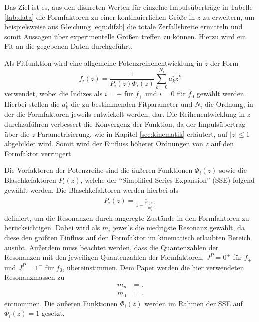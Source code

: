 Das Ziel ist es, aus den diskreten Werten für einzelne Impulsüberträge in Tabelle \ref{tab:data} die Formfaktoren zu einer kontinuierlichen Größe in $z$ zu erweitern, um beispielsweise aus Gleichung \eqref{eqn:difzb} die totale Zerfallsbreite ermitteln  und somit Aussagen über experimentelle Größen treffen zu können.
Hierzu wird ein Fit an die gegebenen Daten durchgeführt.

Als Fitfunktion wird eine allgemeine Potenzreihenentwicklung in $z$ der Form
\begin{equation}
  \label{eqn:reihenentwicklung}
  f_i(z) = \frac{1}{P_i(z) \Phi_i(z)} \sum_{k=0}^{N_i} a_{k}^{i} z^{k}
\end{equation}
verwendet, wobei die Indizes als $i=+$ für $f_+$ und $i=0$ für $f_0$ gewählt werden.
Hierbei stellen die $a_{k}^{i}$ die zu bestimmenden Fitparameter und $N_i$ die Ordnung, in der die Formfaktoren jeweils entwickelt werden, dar.
Die Reihenentwicklung in $z$ durchzuführen verbessert die Konvergenz der Funktion, da der Impulsübertrag über die $z$-Parametrisierung, wie in Kapitel \ref{sec:kinematik} erläutert, auf $\lvert z \rvert \leq 1$ abgebildet wird.
Somit wird der Einfluss höherer Ordnungen von $z$ auf den Formfaktor verringert.

Die Vorfaktoren der Potenzreihe sind die äußeren Funktionen $\Phi_i(z)$ sowie die Blaschkefaktoren $P_i(z)$, welche der \enquote{Simplified Series Expansion} (SSE) \cite{PhysRevD.79.013008} folgend gewählt werden.
Die Blaschkefaktoren werden hierbei als
\begin{align*}
  P_i(z) = \frac{1}{1 - \frac{q^2(z)}{m_i^2}}
\end{align*}
definiert, um die Resonanzen durch angeregte Zustände in den Formfaktoren zu berücksichtigen.
Dabei wird als $m_i$ jeweils die niedrigste Resonanz gewählt, da diese den größten Einfluss auf den Formfaktor im kinematisch erlaubten Bereich ausübt.
Außerdem muss beachtet werden, dass die Quantenzahlen der Resonanzen mit den jeweiligen Quantenzahlen der Formfaktoren, $J^P = 0^{+}$ für $f_+$ und $J^P = 1^-$ für $f_0$, übereinstimmen.
Dem Paper \cite{PhysRevD.94.094008} werden die hier verwendeten Resonanzmassen zu
\begin{align*}
  m_p &= .\\
  m_0 & = .
\end{align*}
entnommen.
Die äußeren Funktionen $\Phi_i(z)$ werden im Rahmen der SSE auf $\Phi_i(z) = \num{1}$ gesetzt.


